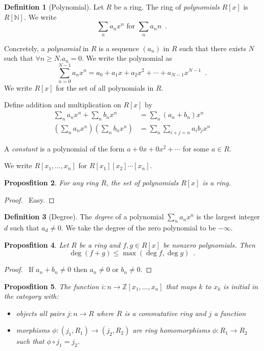 \documentclass{book}
\let\qed\relax
\newtheorem{prop}{Proposfition}[chapter]
\theoremstyle{definition}
\newtheorem{df}[prop]{Definition}
\begin{document}
\begin{df}[Polynomial]
Let $R$ be a ring. The ring of \emph{polynomials} $R[x]$ is $R[\mathbb{N}]$. We write 
\[ \sum_n a_n x^n \text{ for } \sum_n a_n n \enspace . \]

Concretely, a \emph{polynomial} in $R$ is a sequence $(a_n)$ in $R$ such that there exists $N$ such that $\forall n \geq N. a_n = 0$. We write the polynomial as
\[ \sum_{n=0}^{N-1} a_n x^n = a_0 + a_1 x + a_2 x^2 + \cdots + a_{N-1} x^{N-1} \enspace . \]
We write $R[x]$ for the set of all polynomials in $R$.

Define addition and multiplication on $R[x]$ by
\begin{align*}
\sum_n a_n x^n + \sum_n b_n x^n & = \sum_n (a_n + b_n) x^n \\
\left( \sum_n a_n x^n \right) \left( \sum_n b_n x^n \right) & = \sum_n \sum_{i+j=n} a_i b_j x^n
\end{align*}

A \emph{constant} is a polynomial of the form $a + 0x + 0x^2 + \cdots$ for some $a \in R$.

We write $R[x_1, \ldots, x_n]$ for $R[x_1][x_2] \cdots [x_n]$.
\end{df}

\begin{prop}
For any ring $R$, the set of polynomials $R[x]$ is a ring.
\end{prop}

\begin{proof}
\pf\ Easy. \qed
\end{proof}

\begin{df}[Degree]
The \emph{degree} of a polynomial $\sum_n a_n x^n$ is the largest integer $d$ such that $a_d \neq 0$. We take the degree of the zero polynomial to be $- \infty$.
\end{df}

\begin{prop}
Let $R$ be a ring and $f,g \in R[x]$ be nonzero polynomials. Then
\[ \deg(f + g) \leq \max(\deg f, \deg g) \enspace . \]
\end{prop}

\begin{proof}
\pf\ If $a_n + b_n \neq 0$ then $a_n \neq 0$ or $b_n \neq 0$. \qed
\end{proof}

\begin{prop}
The function $i : n \rightarrow \mathbb{Z}[x_1, \ldots, x_n]$ that maps $k$ to $x_k$ is initial in the category with:
\begin{itemize}
\item objects all pairs $j : n \rightarrow R$ where $R$ is a commutative ring and $j$ a function
\item morphisms $\phi : (j_1, R_1) \rightarrow (j_2,R_2)$ are ring homomorphisms $\phi : R_1 \rightarrow R_2$ such that $\phi \circ j_1 = j_2$.
\end{itemize}
\end{prop}
\end{document}
